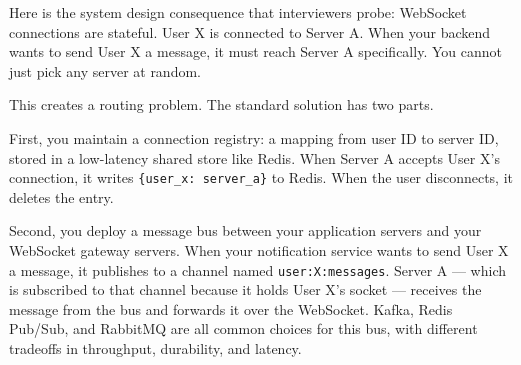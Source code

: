 \documentclass[11pt,a4paper]{article}
\begin{document}
Here is the system design consequence that interviewers probe: WebSocket connections are stateful. User X is connected to Server A. When your backend wants to send User X a message, it must reach Server A specifically. You cannot just pick any server at random.

This creates a routing problem. The standard solution has two parts.

First, you maintain a connection registry: a mapping from user ID to server ID, stored in a low-latency shared store like Redis. When Server A accepts User X's connection, it writes \texttt{\{user\_x: server\_a\}} to Redis. When the user disconnects, it deletes the entry.

Second, you deploy a message bus between your application servers and your WebSocket gateway servers. When your notification service wants to send User X a message, it publishes to a channel named \texttt{user:X:messages}. Server A --- which is subscribed to that channel because it holds User X's socket --- receives the message from the bus and forwards it over the WebSocket. Kafka, Redis Pub/Sub, and RabbitMQ are all common choices for this bus, with different tradeoffs in throughput, durability, and latency.


\vspace{6pt}
\end{document}
